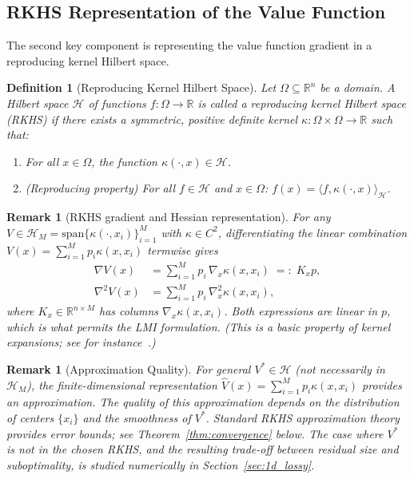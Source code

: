 \documentclass[11pt]{article}
\newtheorem{definition}[theorem]{Definition}
\newtheorem{remark}[theorem]{Remark}
\newcommand{\real}{\mathbb{R}}
\begin{document}
\subsection{RKHS Representation of the Value Function}

The second key component is representing the value function gradient in a reproducing kernel Hilbert space.

\begin{definition}[Reproducing Kernel Hilbert Space]
\label{def:rkhs}
Let $\Omega \subseteq \real^n$ be a domain. A Hilbert space $\mathcal{H}$ of functions $f : \Omega \to \real$ is called a reproducing kernel Hilbert space (RKHS) if there exists a symmetric, positive definite kernel $\kappa : \Omega \times \Omega \to \real$ such that:
\begin{enumerate}
\item For all $x \in \Omega$, the function $\kappa(\cdot, x) \in \mathcal{H}$.
\item (Reproducing property) For all $f \in \mathcal{H}$ and $x \in \Omega$: $f(x) = \langle f, \kappa(\cdot, x) \rangle_{\mathcal{H}}$.
\end{enumerate}
\end{definition}

\begin{remark}[RKHS gradient and Hessian representation]
\label{rem:rkhs_gradient}
For any $V \in \mathcal{H}_M = \mathrm{span}\{\kappa(\cdot,x_i)\}_{i=1}^M$ with $\kappa \in C^2$, differentiating the linear combination $V(x) = \sum_{i=1}^M p_i \kappa(x,x_i)$ termwise gives
\begin{align}
\nabla V(x) &= \sum_{i=1}^M p_i\, \nabla_x \kappa(x, x_i) \;=:\; K_x p, \label{eq:gradient_representation}\\
\nabla^2 V(x) &= \sum_{i=1}^M p_i\, \nabla^2_x \kappa(x, x_i),\label{eq:hessian_representation}
\end{align}
where $K_x \in \real^{n \times M}$ has columns $\nabla_x \kappa(x, x_i)$. Both expressions are linear in $p$, which is what permits the LMI formulation. (This is a basic property of kernel expansions; see for instance~\cite{wendland_scattered}.)
\end{remark}

\begin{remark}[Approximation Quality]
For general $V^* \in \mathcal{H}$ (not necessarily in $\mathcal{H}_M$), the finite-dimensional representation $\hat V(x) = \sum_{i=1}^M p_i \kappa(x,x_i)$ provides an approximation. The quality of this approximation depends on the distribution of centers $\{x_i\}$ and the smoothness of $V^*$. Standard RKHS approximation theory provides error bounds; see Theorem~\ref{thm:convergence} below. The case where $V^*$ is \emph{not} in the chosen RKHS, and the resulting trade-off between residual size and suboptimality, is studied numerically in Section~\ref{sec:1d_lossy}.
\end{remark}
\end{document}
